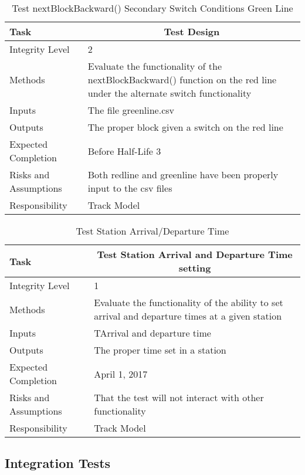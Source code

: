\documentclass[]{article}
\begin{document}
\begin{table}[H]
	\centering
	\caption{Test nextBlockBackward() Secondary Switch Conditions Green Line}
	\begin{tabular}{|l|l|}
		\hline
		Task & \multicolumn{1}{c|}{Test Design} \\ \hline
		Integrity Level & 2 \\ \hline
		Methods & \parbox[t]{10cm}{Evaluate the functionality of the nextBlockBackward() function on the red line under the alternate switch functionality} \\ \hline
		Inputs &  The file greenline.csv \\ \hline
		Outputs &  The proper block given a switch on the red line\\ \hline
		Expected Completion & Before Half-Life 3\\ \hline
		Risks and Assumptions & Both redline and greenline have been properly input to the csv files \\ \hline
		Responsibility & Track Model\\ \hline
	\end{tabular}
\end{table}

\begin{table}[H]
	\centering
	\caption{Test Station Arrival/Departure Time}
	\begin{tabular}{|l|l|}
		\hline
		Task & \multicolumn{1}{c|}{Test Station Arrival and Departure Time setting} \\ \hline
		Integrity Level & 1 \\ \hline
		Methods & Evaluate the functionality of the ability to set arrival and departure times at a given station \\ \hline
		Inputs &  TArrival and departure time \\ \hline
		Outputs &  \parbox[t]{10cm}{The proper time set in a station}\\ \hline
		Expected Completion & April 1, 2017\\ \hline
		Risks and Assumptions & That the test will not interact with other functionality \\ \hline
		Responsibility & Track Model\\ \hline
	\end{tabular}
\end{table}

\subsection{Integration Tests}
\end{document}
